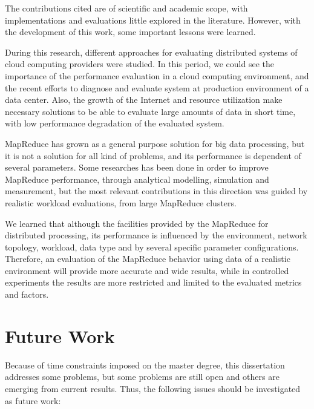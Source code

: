 The contributions cited are of scientific and academic scope, with implementations and evaluations little explored in the literature. However, with the development of this work, some important lessons were learned.

During this research, different approaches for evaluating distributed systems of cloud computing providers were studied. In this period, we could see the importance of the performance evaluation in a cloud computing environment, and the recent efforts to diagnose and evaluate system at production environment of a data center. Also, the growth of the Internet and resource utilization make necessary solutions to be able to evaluate large amounts of data in short time, with low performance degradation of the evaluated system.

MapReduce has grown as a general purpose solution for big data processing, but it is not a solution for all kind of problems, and its performance is dependent of several parameters. Some researches has been done in order to improve MapReduce performance, through analytical modelling, simulation and measurement, but the most relevant contributions in this direction was guided by realistic workload evaluations, from large MapReduce clusters. 

We learned that although the facilities provided by the MapReduce for distributed processing, its performance is influenced by the environment, network topology, workload, data type and by several specific parameter configurations. Therefore, an evaluation of the MapReduce behavior using data of a realistic environment will provide more accurate and wide results, while in controlled experiments the results are more restricted and limited to the evaluated metrics and factors.

\section{Future Work}
\label{sc:conc_futurework}

Because of time constraints imposed on the master degree, this dissertation addresses some problems, but some problems are still open and others are emerging from current results. Thus, the following issues should be investigated as future work:

